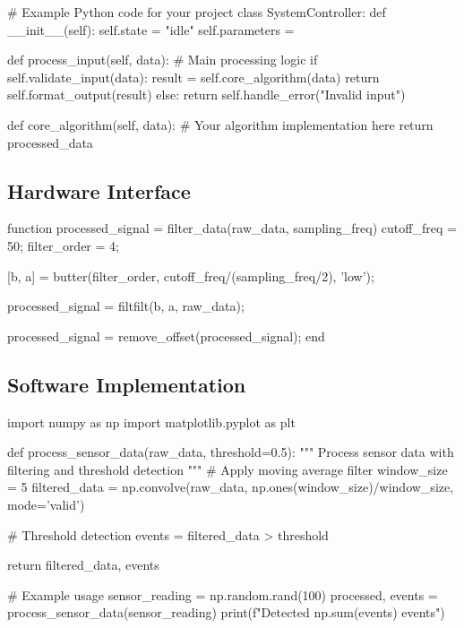 \documentclass[final]{../designreport}
\begin{document}
\begin{reportpython}[caption={Core Algorithm Implementation}]
# Example Python code for your project
class SystemController:
    def __init__(self):
        self.state = "idle"
        self.parameters = {}
    
    def process_input(self, data):
        # Main processing logic
        if self.validate_input(data):
            result = self.core_algorithm(data)
            return self.format_output(result)
        else:
            return self.handle_error("Invalid input")
    
    def core_algorithm(self, data):
        # Your algorithm implementation here
        return processed_data
\end{reportpython}

\subsection{Hardware Interface}

\begin{reportmatlab}[caption={Signal Processing Functions}]
function processed_signal = filter_data(raw_data, sampling_freq)
    cutoff_freq = 50; %
    filter_order = 4;
    
    [b, a] = butter(filter_order, cutoff_freq/(sampling_freq/2), 'low');
    
    processed_signal = filtfilt(b, a, raw_data);
    
    processed_signal = remove_offset(processed_signal);
end
\end{reportmatlab}

\subsection{Software Implementation}

\begin{reportpython}[caption={Data Processing Algorithm}]
import numpy as np
import matplotlib.pyplot as plt

def process_sensor_data(raw_data, threshold=0.5):
    """
    Process sensor data with filtering and threshold detection
    """
    # Apply moving average filter
    window_size = 5
    filtered_data = np.convolve(raw_data, 
                               np.ones(window_size)/window_size, 
                               mode='valid')
    
    # Threshold detection
    events = filtered_data > threshold
    
    return filtered_data, events

# Example usage
sensor_reading = np.random.rand(100)
processed, events = process_sensor_data(sensor_reading)
print(f"Detected {np.sum(events)} events")
\end{reportpython}
\end{document}
